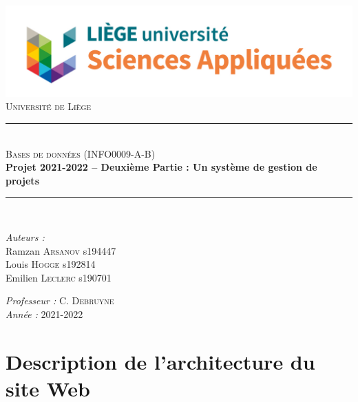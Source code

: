 \documentclass[a4paper, 11pt]{article}
\newcommand{\HRule}{\rule{\linewidth}{0.5mm}}
\begin{document}
\begin{titlepage}

\begin{center}
\includegraphics[scale = 0.35]{logo.jpg}\\
\vspace{1cm}
\textsc{\huge Université de Liège}\\[1.2cm]
\HRule \\[1cm]
\textsc{\LARGE Bases de données (INFO0009-A-B) }\\[1cm]
{\Huge \bfseries Projet 2021-2022 – Deuxième Partie : Un système de gestion de projets}\\[1.4cm] 
\HRule \\[1cm]
\end{center}

\begin{minipage}{0.45\linewidth}
      \begin{flushleft} \large
        \emph{Auteurs : } \\
        Ramzan \textsc{Arsanov}  s194447\\
        Louis \textsc{Hogge}  s192814\\
        Emilien \textsc{Leclerc}  s190701 
      \end{flushleft}
\end{minipage}
\hfill
\begin{minipage}{0.45\linewidth}
      \begin{flushright} \large
        \emph{Professeur : } C. \textsc{Debruyne}\\
        \emph{Année : } 2021-2022 
      \end{flushright}
\end{minipage}

\end{titlepage}

\newpage
\section{Description de l'architecture du site Web}
\end{document}
